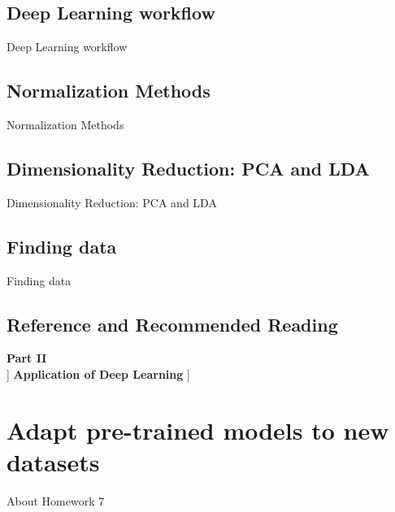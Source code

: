 \documentclass[a4paper,12pt]{article}
\begin{document}
\subsection{Deep Learning workflow}
Deep Learning workflow
\subsection{Normalization Methods}
Normalization Methods
\subsection{Dimensionality Reduction: PCA and LDA}
Dimensionality Reduction: PCA and LDA
\subsection{Finding data}
Finding data
\subsection{Reference and Recommended Reading}

\clearpage
\begin{titlepage}
    \centering
    \vfill 
    {\Huge \textbf{Part II}}\\[1.5cm] ]
    {\LARGE \textbf{Application of Deep Learning}} ]
    \vfill 
\end{titlepage}

\section{Adapt pre-trained models to new datasets }
About Homework 7 
\end{document}
